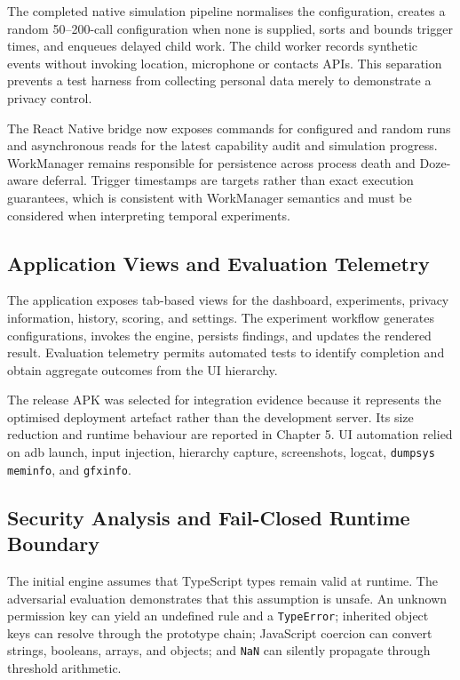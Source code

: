 The completed native simulation pipeline normalises the configuration, creates a random 50--200-call configuration when none is supplied, sorts and bounds trigger times, and enqueues delayed child work. The child worker records synthetic events without invoking location, microphone or contacts APIs. This separation prevents a test harness from collecting personal data merely to demonstrate a privacy control.

The React Native bridge now exposes commands for configured and random runs and asynchronous reads for the latest capability audit and simulation progress. WorkManager remains responsible for persistence across process death and Doze-aware deferral. Trigger timestamps are targets rather than exact execution guarantees, which is consistent with WorkManager semantics and must be considered when interpreting temporal experiments.

\subsection{Application Views and Evaluation Telemetry}

The application exposes tab-based views for the dashboard, experiments, privacy information, history, scoring, and settings. The experiment workflow generates configurations, invokes the engine, persists findings, and updates the rendered result. Evaluation telemetry permits automated tests to identify completion and obtain aggregate outcomes from the UI hierarchy.

The release APK was selected for integration evidence because it represents the optimised deployment artefact rather than the development server. Its size reduction and runtime behaviour are reported in Chapter 5. UI automation relied on adb launch, input injection, hierarchy capture, screenshots, logcat, \texttt{dumpsys meminfo}, and \texttt{gfxinfo}.

\subsection{Security Analysis and Fail-Closed Runtime Boundary}

The initial engine assumes that TypeScript types remain valid at runtime. The adversarial evaluation demonstrates that this assumption is unsafe. An unknown permission key can yield an undefined rule and a \texttt{TypeError}; inherited object keys can resolve through the prototype chain; JavaScript coercion can convert strings, booleans, arrays, and objects; and \texttt{NaN} can silently propagate through threshold arithmetic.

